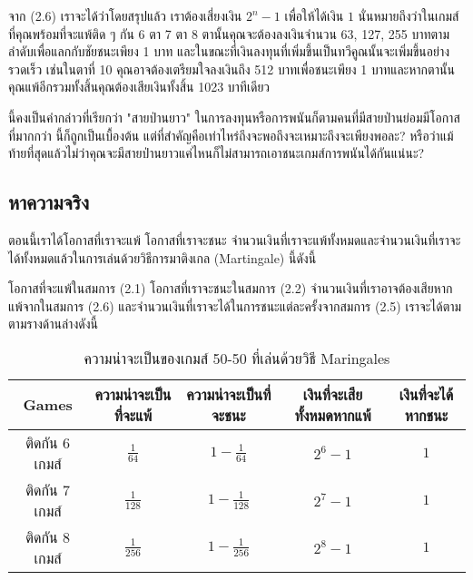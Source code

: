 \documentclass[12pt]{article}
\begin{document}
จาก (2.6) เราจะได้ว่าโดยสรุปแล้ว เราต้องเสี่ยงเงิน $2^n-1$ เพื่อให้ได้เงิน $1$ นั่นหมายถึงว่าในเกมส์ที่คุณพร้อมที่จะแพ้ติด ๆ กัน 6 ตา 7 ตา 8 ตานั้นคุณจะต้องลงเงินจำนวน 63, 127, 255 บาทตามลำดับเพื่อแลกกับชัยชนะเพียง 1 บาท และในขณะที่เงินลงทุนที่เพิ่มขึ้นเป็นทวีคูณนั้นจะเพิ่มขึ้นอย่างรวดเร็ว เช่นในตาที่ 10 คุณอาจต้องเตรียมใจลงเงินถึง 512 บาทเพื่อชนะเพียง 1 บาทและหากตานั้นคุณแพ้อีกรวมทั้งสิ้นคุณต้องเสียเงินทั้งสิ้น 1023 บาทีเดียว
\begin{center}
\end{center}
นี้คงเป็นคำกล่าวที่เรียกว่า "สายป่านยาว" ในการลงทุนหรือการพนันก็ตามคนที่มีสายป่านย่อมมีโอกาสที่มากกว่า นี้ก็ถูกเป็นเบื้องต้น แต่ที่สำคัญคือเท่าไหร่ถึงจะพอถึงจะเหมาะถึงจะเพียงพอละ? หรือว่าแม้ท้ายที่สุดแล้วไม่ว่าคุณจะมีสายป่านยาวแค่ไหนก็ไม่สามารถเอาชนะเกมส์การพนันได้กันแน่นะ?

\subsection{หาความจริง}

ตอนนี้เราได้โอกาสที่เราจะแพ้ โอกาสที่เราจะชนะ จำนวนเงินที่เราจะแพ้ทั้งหมดและจำนวนเงินที่เราจะได้ทั้งหมดแล้วในการเล่นด้วยวิธีการมาติงเกล (Martingale) นี้ดังนี้

โอกาสที่จะแพ้ในสมการ (2.1) โอกาสที่เราจะชนะในสมการ (2.2) จำนวนเงินที่เราอาจต้องเสียหากแพ้จากในสมการ (2.6) และจำนวนเงินที่เราจะได้ในการชนะแต่ละครั้งจากสมการ (2.5) เราจะได้ตามตามรางด้านล่างดังนี้

\begin{table}[hbt]
\centering
\begin{tabular}{|c|c|c|c|c|}
\hline
Games & ความน่าจะเป็นที่จะแพ้ & ความน่าจะเป็นที่จะชนะ & เงินที่จะเสียทั้งหมดหากแพ้ & เงินที่จะได้หากชนะ \\
\hline
ติดกัน 6 เกมส์ & $\frac{1}{64}$ & $1-\frac{1}{64}$ & $2^6-1$ & $1$ \\
ติดกัน 7 เกมส์ & $\frac{1}{128}$ & $1-\frac{1}{128}$ & $2^7-1$ & $1$ \\
ติดกัน 8 เกมส์ & $\frac{1}{256}$ & $1-\frac{1}{256}$ & $2^8-1$ & $1$ \\
\hline
\end{tabular}
\caption{ความน่าจะเป็นของเกมส์ 50-50 ที่เล่นด้วยวิธี Maringales}
\end{table} 
\end{document}
